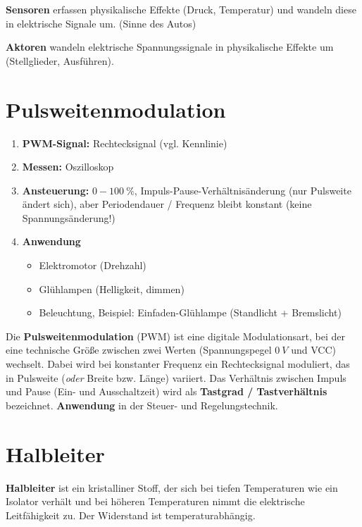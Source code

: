 \textbf{Sensoren} erfassen physikalische Effekte (Druck, Temperatur) und
wandeln diese in elektrische Signale um. (Sinne des Autos)

\textbf{Aktoren} wandeln elektrische Spannungssignale in physikalische
Effekte um (Stellglieder, Ausführen).

\section{Pulsweitenmodulation}\label{pulsweitenmodulation}

\begin{enumerate}
\item
  \textbf{PWM-Signal:} Rechtecksignal (vgl. Kennlinie)
\item
  \textbf{Messen:} Oszilloskop
\item
  \textbf{Ansteuerung:} $0 - 100~\%$, Impuls-Pause-Verhältnisänderung
  (nur Pulsweite ändert sich), aber Periodendauer / Frequenz bleibt
  konstant (keine Spannungsänderung!)
\item
  \textbf{Anwendung}

  \begin{itemize}
  \item
    Elektromotor (Drehzahl)
  \item
    Glühlampen (Helligkeit, dimmen)
  \item
    Beleuchtung, Beispiel: Einfaden-Glühlampe (Standlicht + Bremslicht)
  \end{itemize}
\end{enumerate}

Die \textbf{Pulsweitenmodulation} (PWM) ist eine digitale
Modulationsart, bei der eine technische Größe zwischen zwei Werten
(Spannungspegel $0~V$ und VCC) wechselt. Dabei wird bei konstanter
Frequenz ein Rechtecksignal moduliert, das in Pulsweite (\emph{oder}
Breite bzw. Länge) variiert. Das Verhältnis zwischen Impuls und Pause
(Ein- und Ausschaltzeit) wird als \textbf{Tastgrad / Tastverhältnis}
bezeichnet. \textbf{Anwendung} in der Steuer- und Regelungstechnik.

\section{Halbleiter}\label{halbleiter}

\textbf{Halbleiter} ist ein kristalliner Stoff, der sich bei tiefen
Temperaturen wie ein Isolator verhält und bei höheren Temperaturen nimmt
die elektrische Leitfähigkeit zu. Der Widerstand ist temperaturabhängig.

